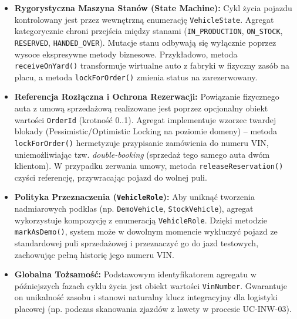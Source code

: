\begin{itemize}
    \item \textbf{Rygorystyczna Maszyna Stanów (State Machine):} Cykl życia pojazdu kontrolowany jest przez wewnętrzną enumerację \texttt{VehicleState}. Agregat kategorycznie chroni przejścia między stanami (\texttt{IN\_PRODUCTION}, \texttt{ON\_STOCK}, \texttt{RESERVED}, \texttt{HANDED\_OVER}). Mutacje stanu odbywają się wyłącznie poprzez wysoce ekspresywne metody biznesowe. Przykładowo, metoda \texttt{receiveOnYard()} transformuje wirtualne auto z fabryki w fizyczny zasób na placu, a metoda \texttt{lockForOrder()} zmienia status na zarezerwowany.
    \item \textbf{Referencja Rozłączna i Ochrona Rezerwacji:} Powiązanie fizycznego auta z umową sprzedażową realizowane jest poprzez opcjonalny obiekt wartości \texttt{OrderId} (krotność 0..1). Agregat implementuje wzorzec twardej blokady (Pessimistic/Optimistic Locking na poziomie domeny) – metoda \texttt{lockForOrder()} hermetyzuje przypisanie zamówienia do numeru VIN, uniemożliwiając tzw. \textit{double-booking} (sprzedaż tego samego auta dwóm klientom). W przypadku zerwania umowy, metoda \texttt{releaseReservation()} czyści referencję, przywracając pojazd do wolnej puli.
    \item \textbf{Polityka Przeznaczenia (\texttt{VehicleRole}):} Aby uniknąć tworzenia nadmiarowych podklas (np. \texttt{DemoVehicle}, \texttt{StockVehicle}), agregat wykorzystuje kompozycję z enumeracją \texttt{VehicleRole}. Dzięki metodzie \texttt{markAsDemo()}, system może w dowolnym momencie wykluczyć pojazd ze standardowej puli sprzedażowej i przeznaczyć go do jazd testowych, zachowując pełną historię jego numeru VIN.
    \item \textbf{Globalna Tożsamość:} Podstawowym identyfikatorem agregatu w późniejszych fazach cyklu życia jest obiekt wartości \texttt{VinNumber}. Gwarantuje on unikalność zasobu i stanowi naturalny klucz integracyjny dla logistyki placowej (np. podczas skanowania zjazdów z lawety w procesie UC-INW-03).
\end{itemize}